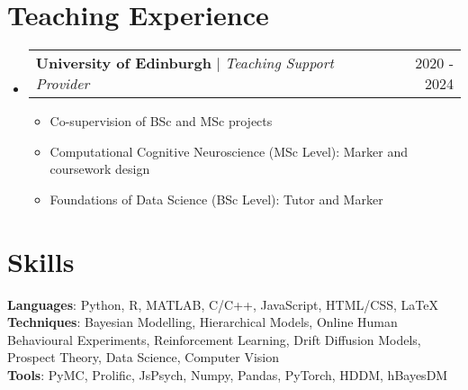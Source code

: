 \documentclass[a4paper,11pt]{article}
\makeatletter
\newcommand{\resumeItem}[1]{
    \item\small{
    {\vspace{-2pt} #1}
  }
}
\newcommand{\resumeProjectHeading}[2]{
    \item
    \begin{tabular*}{0.97\textwidth}{l@{\extracolsep{\fill}}r}
      \small#1 & #2 \\
    \end{tabular*}\vspace{0pt}
}
\newcommand{\resumeSubHeadingListStart}{\begin{itemize}[leftmargin=0.15in, label={}]}
\newcommand{\resumeSubHeadingListEnd}{\end{itemize}}
\newcommand{\resumeItemListStart}{\begin{itemize}[label={\tiny\raisebox{0.5ex}{\textbullet}}]}
\newcommand{\resumeItemListEnd}{\end{itemize}\vspace{-5pt}}
\makeatother
\begin{document}




\section{Teaching Experience}
\resumeSubHeadingListStart
  \resumeProjectHeading
  {\textbf{University of Edinburgh} $|$ \footnotesize\emph{Teaching Support Provider}\vspace{-10pt}}{2020 - 2024}
  \resumeItemListStart
    \resumeItem{Co-supervision of BSc and MSc projects}
    \resumeItem{Computational Cognitive Neuroscience (MSc Level): Marker and coursework design}
    \resumeItem{Foundations of Data Science (BSc Level): Tutor and Marker}
  \resumeItemListEnd
\resumeSubHeadingListEnd






\section{Skills}
\begin{itemize}[leftmargin=0.15in, label={}]
    \small{\item{

          \textbf{Languages}{: Python, R, MATLAB, C/C++, JavaScript, HTML/CSS, \LaTeX} \\
          \textbf{Techniques}{: Bayesian Modelling, Hierarchical Models, Online Human Behavioural Experiments, Reinforcement Learning, Drift Diffusion Models, Prospect Theory, Data Science, Computer Vision}\\
          \textbf{Tools}{: PyMC, Prolific, JsPsych, Numpy, Pandas, PyTorch, HDDM, hBayesDM}
          }}
\end{itemize}
\end{document}
